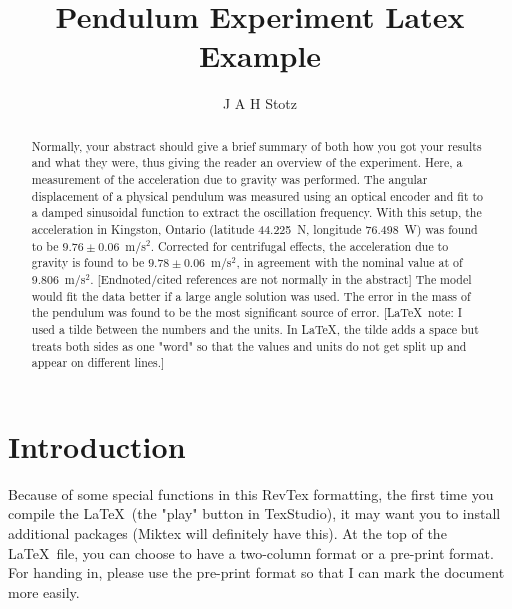 \documentclass[prb,preprint,groupaddress,showpacs,superbib,floats]{revtex4-1}
\begin{document}


\title{Pendulum Experiment Latex Example}
\author{J A H Stotz}

\begin{abstract}


Normally, your abstract should give a brief summary of both how you got your results and what they were, thus giving the reader an overview of the experiment.  Here, a measurement of the acceleration due to gravity was performed.  The angular displacement of a physical pendulum was measured using an optical encoder and fit to a damped sinusoidal function to extract the oscillation frequency.  With this setup, the acceleration in Kingston, Ontario (latitude 44.225~N, longitude 76.498~W) was found to be $9.76 \pm 0.06$~m/s$^2$.  Corrected for centrifugal effects, the acceleration due to gravity is found to be $9.78 \pm 0.06$~m/s$^2$, in agreement with the nominal value at of 9.806~m/s$^2$. [Endnoted/cited references are not normally in the abstract]  The model would fit the data better if a large angle solution was used. The error in the mass of the pendulum was found to be the most significant source of error. [\LaTeX\ note: I used a tilde \~ between the numbers and the units.  In \LaTeX, the tilde adds a space but treats both sides as one "word" so that the values and units do not get split up and appear on different lines.]

\end{abstract}

\maketitle

\section{Introduction}\label{introduction}

Because of some special functions in this RevTex formatting, the first time you compile the \LaTeX \ (the "play" button in TexStudio), it may want you to install additional packages (Miktex will definitely have this).  At the top of the \LaTeX \ file, you can choose to have a two-column format or a pre-print format.  For handing in, please use the pre-print format so that I can mark the document more easily.
\end{document}
